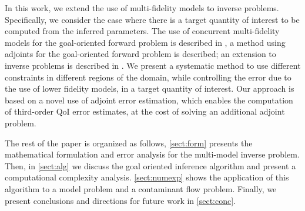 
In this work, we extend the use of multi-fidelity models to inverse problems. Specifically, we consider the case where there is a target quantity of interest to be computed from the inferred parameters. The use of concurrent multi-fidelity models for the goal-oriented forward problem is described in \cite{OdenPrudetal06}, a method using adjoints for the goal-oriented forward problem is described; an extension to inverse problems is described in \cite{OdenPrudetal10}. We present a systematic method to use different constraints in different regions of the domain, while controlling the error due to the use of lower fidelity models, in a target quantity of interest. Our approach is based on a novel use of adjoint error estimation, which enables the computation of third-order QoI error estimates, at the cost of solving an additional adjoint problem.

The rest of the paper is organized as follows, \cref{sect:form} presents the mathematical formulation and error analysis for the multi-model inverse problem. Then, in \cref{sect:alg} we discuss the goal oriented inference algorithm and present a computational complexity analysis. \cref{sect:numexp} shows the application of this algorithm to a model problem and a contaminant flow problem. Finally, we present conclusions and directions for future work in \cref{sect:conc}.

